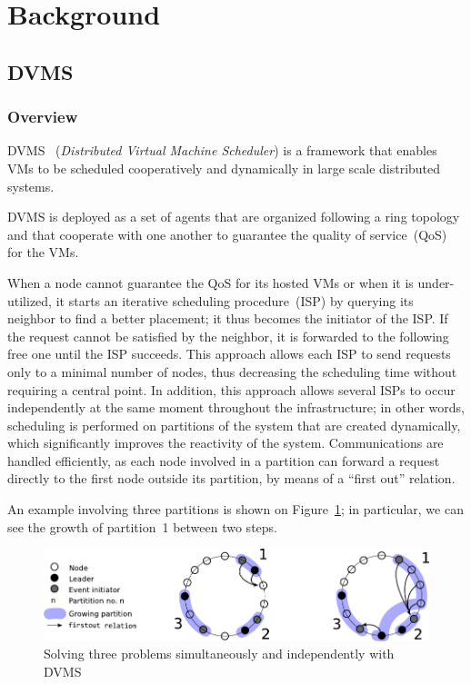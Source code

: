 \section{Background}


\subsection{DVMS}

\subsubsection{Overview}
DVMS~\cite{quesnel:cpe12}
(\emph{Distributed Virtual Machine Scheduler}) is a framework that enables VMs
to be scheduled cooperatively and dynamically in large scale distributed
systems.

DVMS is deployed as a set of agents that are organized following a ring
topology and that cooperate with one another to guarantee the quality of
service~(QoS) for the VMs.

When a node cannot guarantee the QoS for its hosted VMs or when it is
under-utilized, it starts an iterative scheduling procedure~(ISP) by querying
its neighbor to find a better placement; it thus becomes the initiator of the ISP.
If the request cannot be satisfied by the neighbor, it is forwarded to the
following free one until the ISP succeeds.
This approach allows each ISP to send requests only to a minimal
number of nodes, thus decreasing the scheduling time without requiring a
central point.
In addition, this approach allows several ISPs to occur independently at the
same moment throughout the infrastructure; in other words, scheduling is
performed on partitions of the system that are created dynamically, which
significantly improves the reactivity of the system.
Communications are handled efficiently, as each node involved in a partition
can forward a request directly to the first node outside its partition, by
means of a ``first out'' relation.

An example involving three partitions is shown on Figure~\ref{fig:isp}; in
particular, we can see the growth of partition~1 between two steps.
\begin{figure}[h!]
  \centering
  \includegraphics[width=0.9\linewidth]{Figures/resourceAcquisition-standard.pdf}
  \caption{Solving three problems simultaneously and independently with DVMS}%
  \label{fig:isp}%
\end{figure}

